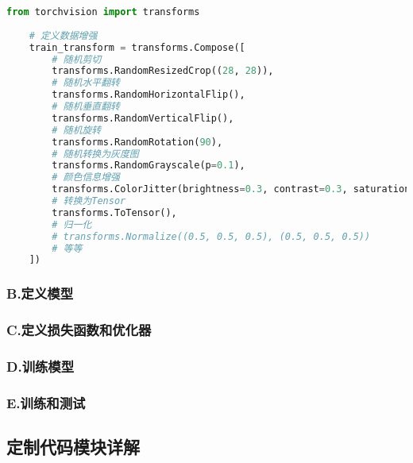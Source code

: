 \begin{lstlisting}[language=python,caption={数据增强格式},label=code:Data Augmentation]
	from torchvision import transforms 
	
	# 定义数据增强
	train_transform = transforms.Compose([
		# 随机剪切
		transforms.RandomResizedCrop((28, 28)),
		# 随机水平翻转
		transforms.RandomHorizontalFlip(),
		# 随机垂直翻转
		transforms.RandomVerticalFlip(),
		# 随机旋转
		transforms.RandomRotation(90),
		# 随机转换为灰度图
		transforms.RandomGrayscale(p=0.1),
		# 颜色信息增强
		transforms.ColorJitter(brightness=0.3, contrast=0.3, saturation=0.3, hue=0.3),
		# 转换为Tensor
		transforms.ToTensor(),
		# 归一化
		# transforms.Normalize((0.5, 0.5, 0.5), (0.5, 0.5, 0.5))
		# 等等
	])
\end{lstlisting}
\subsubsection{B.定义模型}

\subsubsection{C.定义损失函数和优化器}

\subsubsection{D.训练模型}

\subsubsection{E.训练和测试}





\subsection{定制代码模块详解}


\newpage